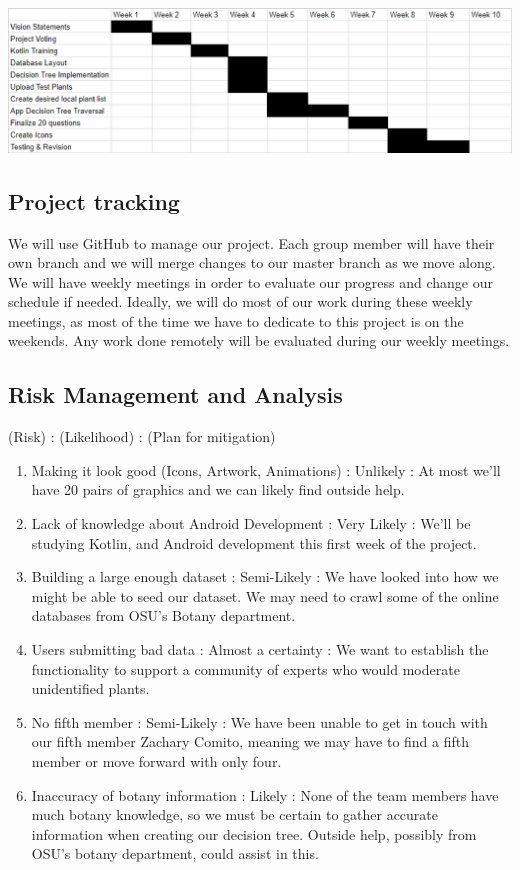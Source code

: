 \documentclass[a4paper]{article}
\begin{document}
\begin{center}\includegraphics[width=6in]{schedule.eps}\end{center}

\subsection{Project tracking}
We will use GitHub to manage our project. Each group member will have their own branch and we will merge changes to our master branch as we move along. We will have weekly meetings in order to evaluate our progress and change our schedule if needed. Ideally, we will do most of our work during these weekly meetings, as most of the time we have to dedicate to this project is on the weekends. Any work done remotely will be evaluated during our weekly meetings. 

\subsection{Risk Management and Analysis}
(Risk) : (Likelihood) : (Plan for mitigation)
\begin{enumerate}
\item Making it look good (Icons, Artwork, Animations) : Unlikely : At most we'll have 20 pairs of graphics and we can likely find outside help.
\item Lack of knowledge about Android Development : Very Likely : We'll be studying Kotlin, and Android development this first week of the project.
\item Building a large enough dataset : Semi-Likely : We have looked into how we might be able to seed our dataset.  We may need to crawl some of the online databases from OSU's Botany department.
\item Users submitting bad data : Almost a certainty : We want to establish the functionality to support a community of experts who would moderate unidentified plants.
\item No fifth member : Semi-Likely : We have been unable to get in touch with our fifth member Zachary Comito, meaning we may have to find a fifth member or move forward with only four. 
\item Inaccuracy of botany information : Likely : None of the team members have much botany knowledge, so we must be certain to gather accurate information when creating our decision tree. Outside help, possibly from OSU's botany department, could assist in this. 
\end{enumerate}
\end{document}
